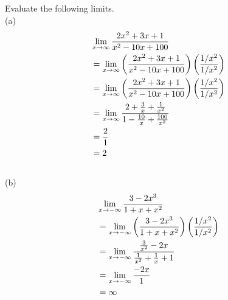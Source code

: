\begin{exercise}\nonumber
	Evaluate the following limits. \\

	(a)
	\begin{align}
		 & \lim\limits_{x \rightarrow \infty}{2x^2 + 3x + 1 \over x^2 - 10x + 100}                                            \\
		 & = \lim\limits_{x \rightarrow \infty}{\left({2x^2+3x+1 \over x^2-10x+100}\right)\left({1/x^2 \over 1/x^2}\right)}   \\
		 & = \lim\limits_{x \rightarrow \infty}{\left({2x^2+3x+1 \over x^2-10x+100}\right)\left({1/x^2 \over 1/x^2}\right)}   \\
		 & = \lim\limits_{x \rightarrow \infty}{{2 + {3 \over x} + {1 \over x^2}} \over {1 - {10 \over x} + {100 \over x^2}}} \\
		 & = {2 \over 1}                                                                                                      \\
		 & = 2
	\end{align}
	\\

	(b)
	\begin{align}
		 & \lim\limits_{x \rightarrow -\infty}{3 - 2x^3 \over 1 + x + x^2}                                            \\
		 & = \lim\limits_{x \rightarrow -\infty}{\left({3-2x^3 \over 1+x+x^2}\right)\left({1/x^2 \over 1/x^2}\right)} \\
		 & = \lim\limits_{x \rightarrow -\infty}{{3 \over x^2} - 2x \over {{1 \over x^2} + {1 \over x} + 1}}          \\
		 & = \lim\limits_{x \rightarrow -\infty}{-2x \over 1}                                                         \\
		 & = \infty
	\end{align}
	\\


\end{exercise}
